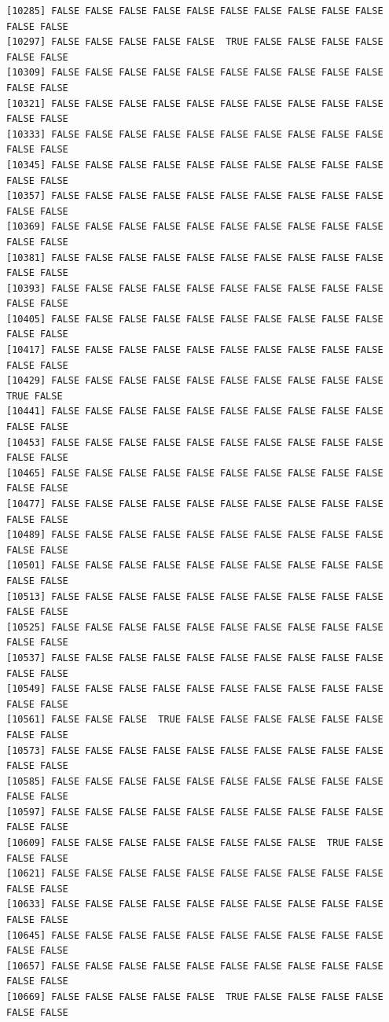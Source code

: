 \documentclass[
  a4paper,
  DIV=11,
  numbers=noendperiod]{scrartcl}
\begin{document}
\begin{verbatim}
[10285] FALSE FALSE FALSE FALSE FALSE FALSE FALSE FALSE FALSE FALSE FALSE FALSE
[10297] FALSE FALSE FALSE FALSE FALSE  TRUE FALSE FALSE FALSE FALSE FALSE FALSE
[10309] FALSE FALSE FALSE FALSE FALSE FALSE FALSE FALSE FALSE FALSE FALSE FALSE
[10321] FALSE FALSE FALSE FALSE FALSE FALSE FALSE FALSE FALSE FALSE FALSE FALSE
[10333] FALSE FALSE FALSE FALSE FALSE FALSE FALSE FALSE FALSE FALSE FALSE FALSE
[10345] FALSE FALSE FALSE FALSE FALSE FALSE FALSE FALSE FALSE FALSE FALSE FALSE
[10357] FALSE FALSE FALSE FALSE FALSE FALSE FALSE FALSE FALSE FALSE FALSE FALSE
[10369] FALSE FALSE FALSE FALSE FALSE FALSE FALSE FALSE FALSE FALSE FALSE FALSE
[10381] FALSE FALSE FALSE FALSE FALSE FALSE FALSE FALSE FALSE FALSE FALSE FALSE
[10393] FALSE FALSE FALSE FALSE FALSE FALSE FALSE FALSE FALSE FALSE FALSE FALSE
[10405] FALSE FALSE FALSE FALSE FALSE FALSE FALSE FALSE FALSE FALSE FALSE FALSE
[10417] FALSE FALSE FALSE FALSE FALSE FALSE FALSE FALSE FALSE FALSE FALSE FALSE
[10429] FALSE FALSE FALSE FALSE FALSE FALSE FALSE FALSE FALSE FALSE  TRUE FALSE
[10441] FALSE FALSE FALSE FALSE FALSE FALSE FALSE FALSE FALSE FALSE FALSE FALSE
[10453] FALSE FALSE FALSE FALSE FALSE FALSE FALSE FALSE FALSE FALSE FALSE FALSE
[10465] FALSE FALSE FALSE FALSE FALSE FALSE FALSE FALSE FALSE FALSE FALSE FALSE
[10477] FALSE FALSE FALSE FALSE FALSE FALSE FALSE FALSE FALSE FALSE FALSE FALSE
[10489] FALSE FALSE FALSE FALSE FALSE FALSE FALSE FALSE FALSE FALSE FALSE FALSE
[10501] FALSE FALSE FALSE FALSE FALSE FALSE FALSE FALSE FALSE FALSE FALSE FALSE
[10513] FALSE FALSE FALSE FALSE FALSE FALSE FALSE FALSE FALSE FALSE FALSE FALSE
[10525] FALSE FALSE FALSE FALSE FALSE FALSE FALSE FALSE FALSE FALSE FALSE FALSE
[10537] FALSE FALSE FALSE FALSE FALSE FALSE FALSE FALSE FALSE FALSE FALSE FALSE
[10549] FALSE FALSE FALSE FALSE FALSE FALSE FALSE FALSE FALSE FALSE FALSE FALSE
[10561] FALSE FALSE FALSE  TRUE FALSE FALSE FALSE FALSE FALSE FALSE FALSE FALSE
[10573] FALSE FALSE FALSE FALSE FALSE FALSE FALSE FALSE FALSE FALSE FALSE FALSE
[10585] FALSE FALSE FALSE FALSE FALSE FALSE FALSE FALSE FALSE FALSE FALSE FALSE
[10597] FALSE FALSE FALSE FALSE FALSE FALSE FALSE FALSE FALSE FALSE FALSE FALSE
[10609] FALSE FALSE FALSE FALSE FALSE FALSE FALSE FALSE  TRUE FALSE FALSE FALSE
[10621] FALSE FALSE FALSE FALSE FALSE FALSE FALSE FALSE FALSE FALSE FALSE FALSE
[10633] FALSE FALSE FALSE FALSE FALSE FALSE FALSE FALSE FALSE FALSE FALSE FALSE
[10645] FALSE FALSE FALSE FALSE FALSE FALSE FALSE FALSE FALSE FALSE FALSE FALSE
[10657] FALSE FALSE FALSE FALSE FALSE FALSE FALSE FALSE FALSE FALSE FALSE FALSE
[10669] FALSE FALSE FALSE FALSE FALSE  TRUE FALSE FALSE FALSE FALSE FALSE FALSE

\end{verbatim}
\end{document}
